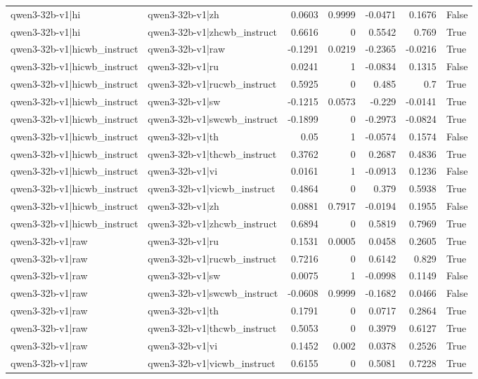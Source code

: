 \begin{table}
\begin{tabular}{l l r r r r l}
qwen3-32b-v1|hi & qwen3-32b-v1|zh & 0.0603 & 0.9999 & -0.0471 & 0.1676 & False \\
qwen3-32b-v1|hi & qwen3-32b-v1|zhcwb_instruct & 0.6616 & 0 & 0.5542 & 0.769 & True \\
qwen3-32b-v1|hicwb_instruct & qwen3-32b-v1|raw & -0.1291 & 0.0219 & -0.2365 & -0.0216 & True \\
qwen3-32b-v1|hicwb_instruct & qwen3-32b-v1|ru & 0.0241 & 1 & -0.0834 & 0.1315 & False \\
qwen3-32b-v1|hicwb_instruct & qwen3-32b-v1|rucwb_instruct & 0.5925 & 0 & 0.485 & 0.7 & True \\
qwen3-32b-v1|hicwb_instruct & qwen3-32b-v1|sw & -0.1215 & 0.0573 & -0.229 & -0.0141 & True \\
qwen3-32b-v1|hicwb_instruct & qwen3-32b-v1|swcwb_instruct & -0.1899 & 0 & -0.2973 & -0.0824 & True \\
qwen3-32b-v1|hicwb_instruct & qwen3-32b-v1|th & 0.05 & 1 & -0.0574 & 0.1574 & False \\
qwen3-32b-v1|hicwb_instruct & qwen3-32b-v1|thcwb_instruct & 0.3762 & 0 & 0.2687 & 0.4836 & True \\
qwen3-32b-v1|hicwb_instruct & qwen3-32b-v1|vi & 0.0161 & 1 & -0.0913 & 0.1236 & False \\
qwen3-32b-v1|hicwb_instruct & qwen3-32b-v1|vicwb_instruct & 0.4864 & 0 & 0.379 & 0.5938 & True \\
qwen3-32b-v1|hicwb_instruct & qwen3-32b-v1|zh & 0.0881 & 0.7917 & -0.0194 & 0.1955 & False \\
qwen3-32b-v1|hicwb_instruct & qwen3-32b-v1|zhcwb_instruct & 0.6894 & 0 & 0.5819 & 0.7969 & True \\
qwen3-32b-v1|raw & qwen3-32b-v1|ru & 0.1531 & 0.0005 & 0.0458 & 0.2605 & True \\
qwen3-32b-v1|raw & qwen3-32b-v1|rucwb_instruct & 0.7216 & 0 & 0.6142 & 0.829 & True \\
qwen3-32b-v1|raw & qwen3-32b-v1|sw & 0.0075 & 1 & -0.0998 & 0.1149 & False \\
qwen3-32b-v1|raw & qwen3-32b-v1|swcwb_instruct & -0.0608 & 0.9999 & -0.1682 & 0.0466 & False \\
qwen3-32b-v1|raw & qwen3-32b-v1|th & 0.1791 & 0 & 0.0717 & 0.2864 & True \\
qwen3-32b-v1|raw & qwen3-32b-v1|thcwb_instruct & 0.5053 & 0 & 0.3979 & 0.6127 & True \\
qwen3-32b-v1|raw & qwen3-32b-v1|vi & 0.1452 & 0.002 & 0.0378 & 0.2526 & True \\
qwen3-32b-v1|raw & qwen3-32b-v1|vicwb_instruct & 0.6155 & 0 & 0.5081 & 0.7228 & True \\

\end{tabular}
\end{table}
